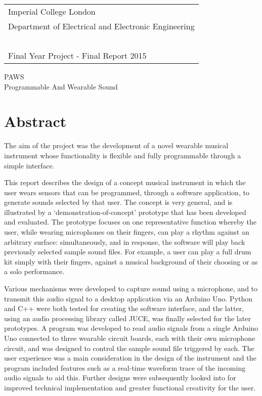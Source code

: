 \thispagestyle{empty}

\large
\begin{tabular}{|l}
Imperial College London\\
Department of Electrical and Electronic Engineering\\~\\
Final Year Project - Final Report 2015
\end{tabular}

\vspace{60 pt}
\begin{center}
\huge PAWS\\
\LARGE Programmable And Wearable Sound\\
\end{center}


\normalsize
\section*{Abstract} \label{Project Specification}

The aim of the project was the development of a novel wearable musical instrument whose functionality is flexible and fully programmable through a simple interface.

This report describes the design of a concept musical instrument in which the user wears sensors that can be programmed, through a software application, to generate sounds selected by that user. The concept is very general, and is illustrated by a ‘demonstration-of-concept’ prototype that has been developed and evaluated.  The prototype focuses on one representative function whereby the user, while wearing microphones on their fingers, can play a rhythm against an arbitrary surface: simultaneously, and in response, the software will play back previously selected sample sound files. For example, a user can play a full drum kit simply with their fingers, against a musical background of their choosing or as a solo performance.

Various mechanisms were developed to capture sound using a microphone, and to transmit this audio signal to a desktop application via an Arduino Uno. Python and C++ were both tested for creating the software interface, and the latter, using an audio processing library called JUCE, was finally selected for the later prototypes. A program was developed to read audio signals from a single Arduino Uno connected to three wearable circuit boards, each with their own microphone circuit, and was designed to control the sample sound file triggered by each. The user experience was a main consideration in the design of the instrument and the program included features such as a real-time waveform trace of the incoming audio signals to aid this. Further designs were subsequently looked into for improved technical implementation and greater functional creativity for the user.




